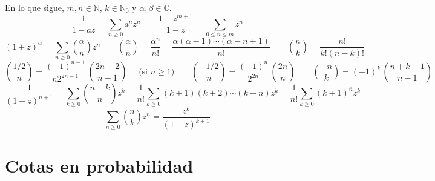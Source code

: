 \documentclass[english, spanish, fleqn]{article}
\begin{document}
  En lo que sigue,
  \(m, n \in \mathbb{N}\),
  \(k \in \mathbb{N}_0\)
  y \(\alpha, \beta \in \mathbb{C}\).
  \begin{equation*}
    \frac{1}{1 - a z}
      = \sum_{n \ge 0} a^n z^n
	 \qquad \frac{1 - z^{m + 1}}{1 - z}
	    = \sum_{0 \le n \le m} z^n
  \end{equation*}
  \begin{equation*}
    (1 + z)^\alpha
      = \sum_{n \ge 0} \binom{\alpha}{n} z^n
	 \qquad \binom{\alpha}{n}
	     = \frac{\alpha^{\underline{n}}}{n!}
	     = \frac{\alpha (\alpha - 1) \dotsm (\alpha - n + 1)}{n!}
	 \qquad
    \binom{n}{k}
	     = \frac{n!}{k! (n - k)!}
  \end{equation*}
  \begin{equation*}
    \binom{1/2}{n}
      = \frac{(-1)^{n - 1}}{n 2^{2 n - 1}} \, \binom{2 n - 2}{n - 1}
	    \quad \text{\ (si \(n \ge 1\))}
      \qquad
    \binom{-1/2}{n}
      = \frac{(-1)^n}{2^{2 n}} \, \binom{2 n}{n} \qquad
    \binom{-n}{k}
      = (-1)^k \, \binom{n + k - 1}{n - 1}
  \end{equation*}
  \begin{equation*}
    \frac{1}{(1 - z)^{n + 1}}
      = \sum_{k \ge 0} \binom{n + k}{n} z^k
      = \frac{1}{n!}
	   \sum_{k \ge 0} (k + 1) (k + 2) \dotsm (k + n) z^k
      = \frac{1}{n!} \sum_{k \ge 0} (k + 1)^{\bar{n}} z^k
  \end{equation*}
  \begin{equation*}
    \sum_{n \ge 0} \binom{n}{k} z^n
      = \frac{z^k}{(1 - z)^{k + 1}}
  \end{equation*}

\section*{Cotas en probabilidad}
\label{sec:cotas-probabilidad}
\end{document}
